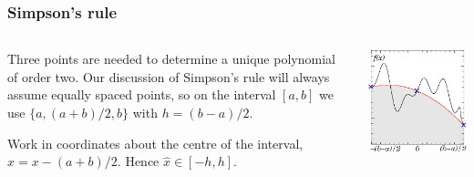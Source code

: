 \documentclass{beamer}
\begin{document}
\begin{frame}
  \frametitle{Simpson's rule}

  \begin{columns}
    \begin{column}{0.5\textwidth}
      Three points are needed to determine a unique polynomial of
      order two. Our discussion of Simpson's rule will always assume
      equally spaced points, so on the interval $[a, b]$ we use $\{a,
      (a+b)/2, b\}$ with $h = (b-a)/2$. \pause

      \vspace{1ex}

      Work in coordinates about the centre of the interval, $\hat{x} =
      x - (a+b)/2$. Hence $\hat{x} \in [-h, h]$.
    \end{column}
    \begin{column}{0.5\textwidth}
      \begin{center}
        \includegraphics[width=\textwidth]{figures/SimpsonNodes}
      \end{center}
    \end{column}
  \end{columns}


\end{frame}
\end{document}
